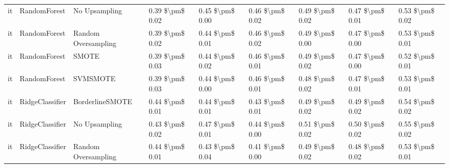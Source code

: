 \begin{tabular}{lllllllll}
      it &                    RandomForest &                 No Upsampling & 0.39 \$\textbackslash pm\$ 0.02 &           0.45 \$\textbackslash pm\$ 0.00 &       0.46 \$\textbackslash pm\$ 0.02 &        0.49 \$\textbackslash pm\$ 0.02 &                         0.47 \$\textbackslash pm\$ 0.01 &     0.53 \$\textbackslash pm\$ 0.02 \\
      it &                    RandomForest &           Random Oversampling & 0.39 \$\textbackslash pm\$ 0.02 &           0.44 \$\textbackslash pm\$ 0.01 &       0.46 \$\textbackslash pm\$ 0.02 &        0.49 \$\textbackslash pm\$ 0.00 &                         0.47 \$\textbackslash pm\$ 0.00 &     0.53 \$\textbackslash pm\$ 0.01 \\
      it &                    RandomForest &                         SMOTE & 0.39 \$\textbackslash pm\$ 0.03 &           0.44 \$\textbackslash pm\$ 0.02 &       0.46 \$\textbackslash pm\$ 0.01 &        0.49 \$\textbackslash pm\$ 0.02 &                         0.47 \$\textbackslash pm\$ 0.00 &     0.52 \$\textbackslash pm\$ 0.01 \\
      it &                    RandomForest &                      SVMSMOTE & 0.39 \$\textbackslash pm\$ 0.03 &           0.44 \$\textbackslash pm\$ 0.00 &       0.46 \$\textbackslash pm\$ 0.01 &        0.48 \$\textbackslash pm\$ 0.02 &                         0.47 \$\textbackslash pm\$ 0.01 &     0.53 \$\textbackslash pm\$ 0.01 \\
      it &                 RidgeClassifier &               BorderlineSMOTE & 0.44 \$\textbackslash pm\$ 0.01 &           0.44 \$\textbackslash pm\$ 0.01 &       0.43 \$\textbackslash pm\$ 0.01 &        0.49 \$\textbackslash pm\$ 0.02 &                         0.49 \$\textbackslash pm\$ 0.02 &     0.54 \$\textbackslash pm\$ 0.02 \\
      it &                 RidgeClassifier &                 No Upsampling & 0.43 \$\textbackslash pm\$ 0.02 &           0.47 \$\textbackslash pm\$ 0.01 &       0.44 \$\textbackslash pm\$ 0.00 &        0.51 \$\textbackslash pm\$ 0.02 &                         0.50 \$\textbackslash pm\$ 0.02 &     0.55 \$\textbackslash pm\$ 0.02 \\
      it &                 RidgeClassifier &           Random Oversampling & 0.44 \$\textbackslash pm\$ 0.01 &           0.43 \$\textbackslash pm\$ 0.04 &       0.41 \$\textbackslash pm\$ 0.00 &        0.49 \$\textbackslash pm\$ 0.02 &                         0.48 \$\textbackslash pm\$ 0.02 &     0.53 \$\textbackslash pm\$ 0.01 \\

\end{tabular}
